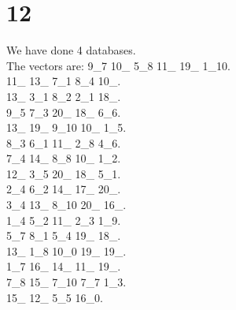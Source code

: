 \chapter{12}
\indent We have done 4 databases.\\
The vectors are:
9\_7 10\_ 5\_8 11\_ 19\_ 1\_10.\\11\_ 13\_ 7\_1 8\_4 10\_.\\13\_ 3\_1 8\_2 2\_1 18\_.\\9\_5 7\_3 20\_ 18\_ 6\_6.\\13\_ 19\_ 9\_10 10\_ 1\_5.\\8\_3 6\_1 11\_ 2\_8 4\_6.\\7\_4 14\_ 8\_8 10\_ 1\_2.\\12\_ 3\_5 20\_ 18\_ 5\_1.\\2\_4 6\_2 14\_ 17\_ 20\_.\\3\_4 13\_ 8\_10 20\_ 16\_.\\1\_4 5\_2 11\_ 2\_3 1\_9.\\5\_7 8\_1 5\_4 19\_ 18\_.\\13\_ 1\_8 10\_0 19\_ 19\_.\\1\_7 16\_ 14\_ 11\_ 19\_.\\7\_8 15\_ 7\_10 7\_7 1\_3.\\15\_ 12\_ 5\_5 16\_0.\\